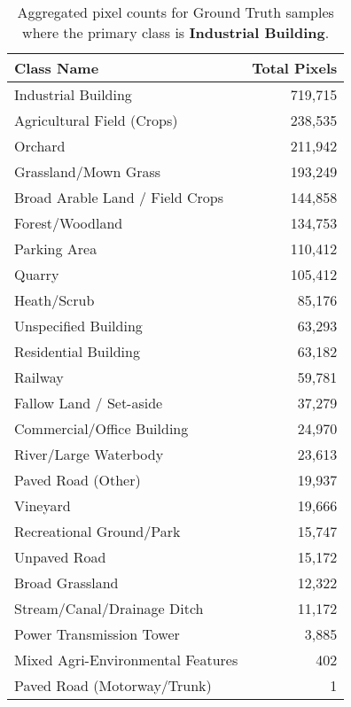 \begin{table}[H] %
    \centering
    \caption{Aggregated pixel counts for Ground Truth samples where the primary class is \textbf{Industrial Building}.}
    \label{tab:gt_counts_3}
    \begin{tabular}{lr}
        \hline
        \textbf{Class Name} & \textbf{Total Pixels} \\
        \hline
        Industrial Building & 719,715 \\
        Agricultural Field (Crops) & 238,535 \\
        Orchard & 211,942 \\
        Grassland/Mown Grass & 193,249 \\
        Broad Arable Land / Field Crops & 144,858 \\
        Forest/Woodland & 134,753 \\
        Parking Area & 110,412 \\
        Quarry & 105,412 \\
        Heath/Scrub & 85,176 \\
        Unspecified Building & 63,293 \\
        Residential Building & 63,182 \\
        Railway & 59,781 \\
        Fallow Land / Set-aside & 37,279 \\
        Commercial/Office Building & 24,970 \\
        River/Large Waterbody & 23,613 \\
        Paved Road (Other) & 19,937 \\
        Vineyard & 19,666 \\
        Recreational Ground/Park & 15,747 \\
        Unpaved Road & 15,172 \\
        Broad Grassland & 12,322 \\
        Stream/Canal/Drainage Ditch & 11,172 \\
        Power Transmission Tower & 3,885 \\
        Mixed Agri-Environmental Features & 402 \\
        Paved Road (Motorway/Trunk) & 1 \\
        \hline
    \end{tabular}
\end{table}

